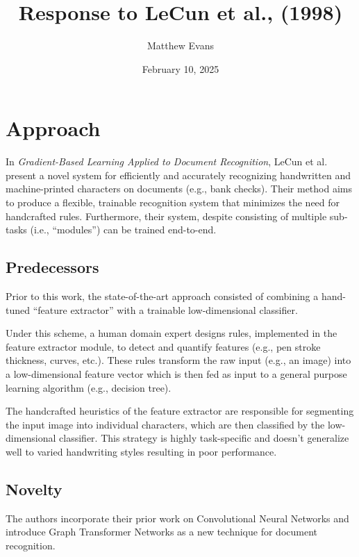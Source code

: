 \documentclass[10pt]{article}
\title{
    Response to LeCun et al., (1998) \\
}
\author{Matthew Evans}
\date{February 10, 2025}
\begin{document}
\maketitle

\section*{Approach}
In \textit{Gradient-Based Learning Applied to Document Recognition}\cite{lecun1998gradient}, LeCun et al. present a novel system for efficiently and accurately recognizing handwritten and machine-printed characters on documents (e.g., bank checks). Their method aims to produce a flexible, trainable recognition system that minimizes the need for handcrafted rules. Furthermore, their system, despite consisting of multiple sub-tasks (i.e., ``modules'') can be trained end-to-end.


\subsection*{Predecessors}


Prior to this work, the state-of-the-art approach consisted of combining a hand-tuned ``feature extractor'' with a trainable low-dimensional classifier.

Under this scheme, a human domain expert designs rules, implemented in the feature extractor module, to detect and quantify features (e.g., pen stroke thickness, curves, etc.). These rules transform the raw input (e.g., an image) into a low-dimensional feature vector which is then fed as input to a general purpose learning algorithm (e.g., decision tree).

The handcrafted heuristics of the feature extractor are responsible for segmenting the input image into individual characters, which are then classified by the low-dimensional classifier. This strategy is highly task-specific and doesn't generalize well to varied handwriting styles resulting in poor performance.


\subsection*{Novelty}
The authors incorporate their prior work on Convolutional Neural Networks\cite{10.1162/neco.1989.1.4.541} and introduce Graph Transformer Networks as a new technique for document recognition.
\end{document}
